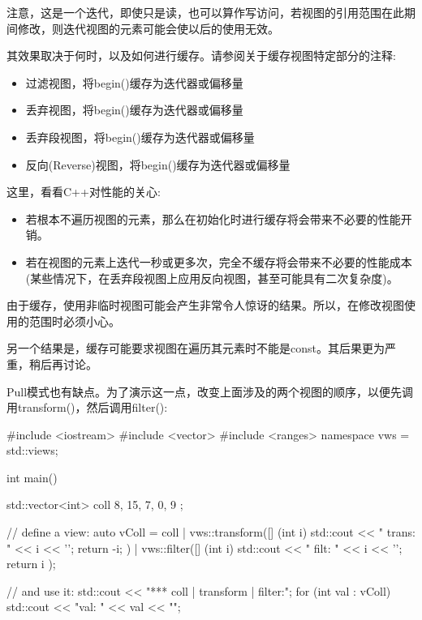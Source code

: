 注意，这是一个迭代，即使只是读，也可以算作写访问，若视图的引用范围在此期间修改，则迭代视图的元素可能会使以后的使用无效。

其效果取决于何时，以及如何进行缓存。请参阅关于缓存视图特定部分的注释:

\begin{itemize}
\item
过滤视图，将begin()缓存为迭代器或偏移量

\item
丢弃视图，将begin()缓存为迭代器或偏移量

\item
丢弃段视图，将begin()缓存为迭代器或偏移量

\item
反向(Reverse)视图，将begin()缓存为迭代器或偏移量
\end{itemize}

这里，看看C++对性能的关心:

\begin{itemize}
\item
若根本不遍历视图的元素，那么在初始化时进行缓存将会带来不必要的性能开销。

\item
若在视图的元素上迭代一秒或更多次，完全不缓存将会带来不必要的性能成本(某些情况下，在丢弃段视图上应用反向视图，甚至可能具有二次复杂度)。
\end{itemize}

由于缓存，使用非临时视图可能会产生非常令人惊讶的结果。所以，在修改视图使用的范围时必须小心。

另一个结果是，缓存可能要求视图在遍历其元素时不能是const。其后果更为严重，稍后再讨论。


Pull模式也有缺点。为了演示这一点，改变上面涉及的两个视图的顺序，以便先调用transform()，然后调用filter():


\begin{cpp}
#include <iostream>
#include <vector>
#include <ranges>
namespace vws = std::views;

int main()
{
	std::vector<int> coll{ 8, 15, 7, 0, 9 };
	
	// define a view:
	auto vColl = coll
	| vws::transform([] (int i) {
		std::cout << " trans: " << i << '\n';
		return -i;
	})
	| vws::filter([] (int i) {
		std::cout << " filt: " << i << '\n';
		return i %
	});
	
	// and use it:
	std::cout << "*** coll | transform | filter:\n";
	for (int val : vColl) {
	std::cout << "val: " << val << "\n\n";
	}
}
\end{cpp}

